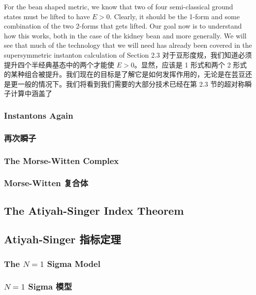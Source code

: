 \documentclass{article}
\begin{document}
\begin{paracol}{2}
For the bean shaped metric, we know that two of four semi-classical ground states must be lifted to have $E > 0$. Clearly, it should be the 1-form and some combination of the two 2-forms that gets lifted. Our goal now is to understand how this works, both in the case of the kidney bean and more generally. We will see that much of the technology that we will need has already been covered in the supersymmetric instanton calculation of Section 2.3
\switchcolumn
对于豆形度规，我们知道必须提升四个半经典基态中的两个才能使 $E > 0$。显然，应该是 1 形式和两个 2 形式的某种组合被提升。我们现在的目标是了解它是如何发挥作用的，无论是在芸豆还是更一般的情况下。我们将看到我们需要的大部分技术已经在第 2.3 节的超对称瞬子计算中涵盖了
\switchcolumn*

\subsubsection{Instantons Again}
\switchcolumn
\subsubsection*{再次瞬子}
\switchcolumn*

\subsubsection{The Morse-Witten Complex}
\switchcolumn
\subsubsection*{Morse-Witten 复合体}
\switchcolumn*

\subsection{The Atiyah-Singer Index Theorem}
\switchcolumn
\subsection*{Atiyah-Singer 指标定理}
\switchcolumn*

\subsubsection{The $N = 1$ Sigma Model}
\switchcolumn
\subsubsection*{$N = 1$ Sigma 模型}
\switchcolumn*


\end{paracol}
\end{document}
